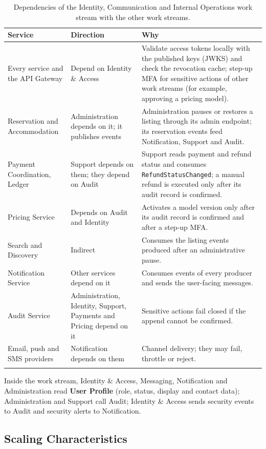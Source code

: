 \begin{longtable}{@{}L{3.4cm}L{2.8cm}L{7.6cm}@{}}
\toprule
\textbf{Service} & \textbf{Direction} & \textbf{Why} \\
\midrule
\endhead
Every service and the API Gateway & Depend on Identity \& Access &
  Validate access tokens locally with the published keys (JWKS) and check
  the revocation cache; step-up MFA for sensitive actions of other work
  streams (for example, approving a pricing model). \\
Reservation and Accommodation & Administration depends on it; it publishes events &
  Administration pauses or restores a listing through its admin endpoint;
  its reservation events feed Notification, Support and Audit. \\
Payment Coordination, Ledger & Support depends on them; they depend on Audit &
  Support reads payment and refund status and consumes
  \texttt{Refund\allowbreak Status\allowbreak Changed}; a manual refund is executed only
  after its audit record is confirmed. \\
Pricing Service & Depends on Audit and Identity &
  Activates a model version only after its audit record is confirmed and
  after a step-up MFA. \\
Search and Discovery & Indirect &
  Consumes the listing events produced after an administrative pause. \\
Notification Service & Other services depend on it &
  Consumes events of every producer and sends the user-facing messages. \\
Audit Service & Administration, Identity, Support, Payments and Pricing depend on it &
  Sensitive actions fail closed if the append cannot be confirmed. \\
Email, push and SMS providers & Notification depends on them &
  Channel delivery; they may fail, throttle or reject. \\
\bottomrule
\caption{Dependencies of the Identity, Communication and Internal Operations
work stream with the other work streams.}
\label{tab:id-dependencies}
\end{longtable}

Inside the work stream, Identity \& Access, Messaging, Notification and
Administration read \textbf{User Profile} (role, status, display and contact
data); Administration and Support call Audit; Identity \& Access sends
security events to Audit and security alerts to Notification.
\endgroup

\subsection{Scaling Characteristics}

